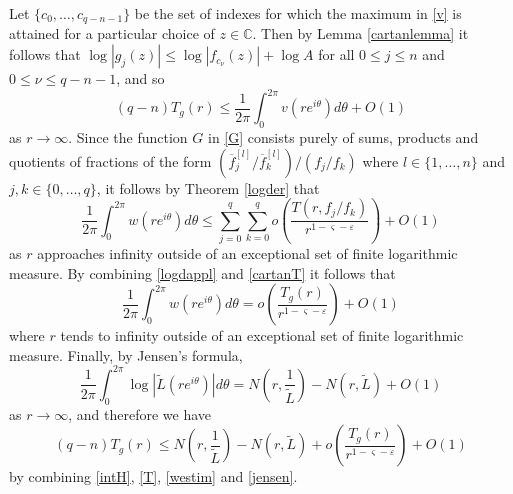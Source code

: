 \documentclass{amsart}
\newcommand{\C}{\mathbb{C}}
\theoremstyle{definition}
\numberwithin{equation}{section}
\numberwithin{theorem}{section}
\begin{document}
Let $\{c_0,\ldots,c_{q-n-1}\}$ be the set of indexes for which the
maximum in \eqref{v} is attained for a particular choice of
$z\in\C$. Then by Lemma \ref{cartanlemma} it follows that
$\log|g_j(z)|\leq \log|f_{c_\nu}(z)|+\log A$ for all $0\leq j\leq
n$ and $0\leq \nu \leq q-n-1$, and so
    \begin{equation}\label{T}
    (q-n)T_g(r)\leq
    \frac{1}{2\pi}\int_0^{2\pi}v(re^{i\theta})d\theta + O(1)
    \end{equation}
as $r\to\infty$. Since the function $G$ in \eqref{G} consists purely of sums,
products and quotients of fractions of the form
$(\overline{f}_{j}^{[l]}/\overline{f}_k^{[l]})/(f_j/f_k)$ where
$l\in\{1,\ldots,n\}$ and $j,k\in\{0,\ldots,q\}$, it follows by
Theorem \ref{logder} that
    \begin{equation}\label{logdappl}
    \frac{1}{2\pi}\int_0^{2\pi}w(re^{i\theta})d\theta \leq   \sum_{j=0}^q\sum_{k=0}^q
    o\left(\frac{T(r,f_j/f_k)}{r^{1-\varsigma-\varepsilon}}\right)+O(1)
    \end{equation}
as $r$ approaches infinity outside of an exceptional set of finite
logarithmic measure. By combining \eqref{logdappl} and
\eqref{cartanT} it follows that
    \begin{equation}\label{westim}
    \frac{1}{2\pi}\int_0^{2\pi}w(re^{i\theta})d\theta =o\left(\frac{T_g(r)}{r^{1-\varsigma-\varepsilon}}\right)+O(1)
    \end{equation}
where $r$ tends to infinity outside of an exceptional set of
finite logarithmic measure. Finally, by Jensen's formula,
    \begin{equation}\label{jensen}
    \frac{1}{2\pi}\int_0^{2\pi} \log|\widetilde L(re^{i\theta})|d\theta =
    N\left(r,\frac{1}{\widetilde L}\right)-N(r,\widetilde L) + O(1)
    \end{equation}
as $r\to\infty$, and therefore we have
    \begin{equation}\label{tildeLineq}
    (q-n)T_g(r)\leq
    N\left(r,\frac{1}{\widetilde L}\right)-N(r,\widetilde L)+o\left(\frac{T_g(r)}{r^{1-\varsigma-\varepsilon}}\right)+O(1)
    \end{equation}
by combining
\eqref{intH}, \eqref{T}, \eqref{westim} and \eqref{jensen}.
\end{document}
